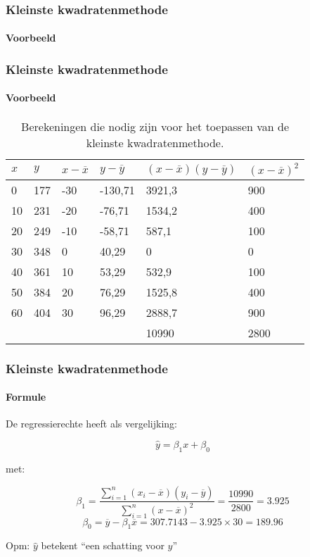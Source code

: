 \documentclass[aspectratio=169]{beamer}
\begin{document}
\begin{frame}
  \frametitle{Kleinste kwadratenmethode}
  \framesubtitle{Voorbeeld}
  
  \centering
\end{frame}

\begin{frame}
  \frametitle{Kleinste kwadratenmethode}
  \framesubtitle{Voorbeeld}
  
  \begin{table}[h] \centering \footnotesize
    \begin{tabular}{@{}llllll@{}}
      \toprule
      $x$   & $y$     & $x-\overline{x}$    & $y - \overline{y}$        & $(x-\overline{x})(y - \overline{y})$       &  $(x-\overline{x})^{2}$    \\ \midrule
      0  & 177 & -30 & -130,71 & 3921,3 & 900  \\
      10 & 231 & -20 & -76,71  & 1534,2 & 400  \\
      20 & 249 & -10 & -58,71  & 587,1  & 100  \\
      30 & 348 & 0   & 40,29   & 0      & 0    \\
      40 & 361 & 10  & 53,29   & 532,9  & 100  \\
      50 & 384 & 20  & 76,29   & 1525,8 & 400  \\
      60 & 404 & 30  & 96,29   & 2888,7 & 900  \\
      &     &     &         & 10990  & 2800 \\ \bottomrule
    \end{tabular}
    \caption{Berekeningen die nodig zijn voor het toepassen van de kleinste kwadratenmethode.}
    \label{tab:rendieren2}
  \end{table}
\end{frame}

\begin{frame}
  \frametitle{Kleinste kwadratenmethode}
  \framesubtitle{Formule}
  
  De regressierechte heeft als vergelijking:
  
  \[ \hat{y} = \beta_1 x + \beta_0 \]
  
  met:
  
  \[ \beta_{1} = \frac{\sum_{i=1}^{n} (x_{i}-\overline{x})(y_{i} - \overline{y})}{\sum_{i=1}^{n} (x-\overline{x})^{2}} = \frac{10990}{2800} = 3.925 \]
  \[ \beta_{0} = \overline{y} - \beta_{1} \overline{x} = 307.7143 - 3.925 \times 30 = 189.96 \]
  
  Opm: $\hat{y}$ betekent ``een schatting voor $y$''
\end{frame}
\end{document}
